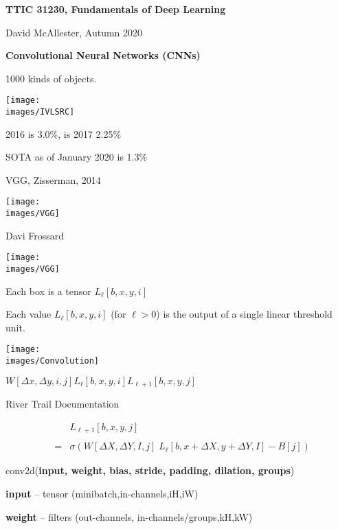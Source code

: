 




{\Huge

  \centerline{\bf TTIC 31230, Fundamentals of Deep Learning}
  \bigskip
  \centerline{David McAllester, Autumn 2020}

    \vfill
  \centerline{\bf Convolutional Neural Networks (CNNs)}
  \vfill
  \vfill



1000 kinds of objects.

\vfill
\centerline{\texttt{[image: \\images/IVLSRC]}}
2016 is 3.0\%, is 2017 2.25\%

\medskip
SOTA as of January 2020 is 1.3\%

{VGG, Zisserman, 2014}

\centerline{\texttt{[image: \\images/VGG]}}
\centerline{\large Davi Frossard}


\centerline{\texttt{[image: \\images/VGG]}}

\vfill
Each box is a tensor $L_\ell[b,x,y,i]$

\vfill
Each value $L_\ell[b,x,y,i]$ (for $\ell > 0$) is the output of a single linear threshold unit.


\centerline{\texttt{[image: \\images/Convolution]}}
\centerline{$W[\Delta x,\Delta y,i,j]$\hspace{6ex}$L_{{\ell}}[b,x,y,i]$\hspace{6ex}$L_{{\ell+1}}[b,x,y,j]$}
\centerline{\large River Trail Documentation}

\begin{eqnarray*}
 & &  L_{{\ell+1}}[b,x,y,j] \\
 \\
  & = &   \sigma\left(W[\Delta X, \Delta Y, I,j]\; L_{{\ell}}[b,x + \Delta X, y + \Delta Y, I] - B[j]\right)
\end{eqnarray*}


conv2d({\bf input, weight, bias, stride, padding, dilation, groups})

\bigskip
{\bf input} – tensor (minibatch,in-channels,iH,iW)

\medskip
{\bf weight} – filters (out-channels, in-channels/groups,kH,kW)

}
